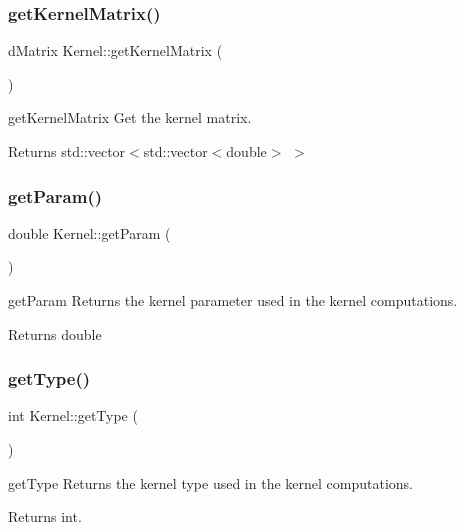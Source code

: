 \subsubsection{\texorpdfstring{get\+Kernel\+Matrix()}{getKernelMatrix()}}
{\footnotesize\ttfamily d\+Matrix Kernel\+::get\+Kernel\+Matrix (\begin{DoxyParamCaption}{ }\end{DoxyParamCaption})}



get\+Kernel\+Matrix Get the kernel matrix. 

\begin{DoxyReturn}{Returns}
std\+::vector$<$std\+::vector$<$double$>$ $>$ 
\end{DoxyReturn}
\mbox{\label{class_kernel_a838e2cc5018fa702e59c52a3bf8ef813}} 
\subsubsection{\texorpdfstring{get\+Param()}{getParam()}}
{\footnotesize\ttfamily double Kernel\+::get\+Param (\begin{DoxyParamCaption}{ }\end{DoxyParamCaption})}



get\+Param Returns the kernel parameter used in the kernel computations. 

\begin{DoxyReturn}{Returns}
double 
\end{DoxyReturn}
\mbox{\label{class_kernel_a5a2cb0fce0eda6c67a2325f6c8958da8}} 
\subsubsection{\texorpdfstring{get\+Type()}{getType()}}
{\footnotesize\ttfamily int Kernel\+::get\+Type (\begin{DoxyParamCaption}{ }\end{DoxyParamCaption})}



get\+Type Returns the kernel type used in the kernel computations. 

\begin{DoxyReturn}{Returns}
int. 
\end{DoxyReturn}
\mbox{\label{class_kernel_a1f548d2e5477ae0ee3dd3bc7f23e6920}} 
